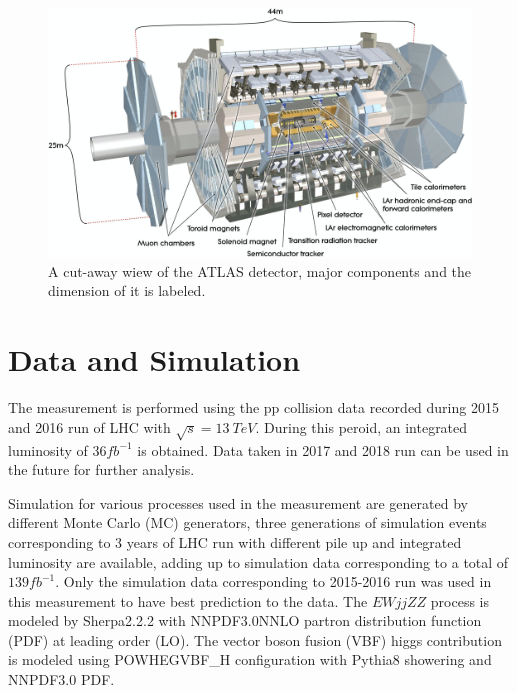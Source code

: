 \documentclass[12pt]{article}
\begin{document}
        \begin{figure}[ht]
            \begin{centering}
            \includegraphics[scale=0.35]{atlas_det.png}
            \caption{A cut-away wiew of the ATLAS detector, major components and the dimension of it is labeled.}
            \end{centering}
        \end{figure}
    \section{Data and Simulation}
        \par The measurement is performed using the pp collision data recorded during 2015 and 2016 run of LHC with $\sqrt{s} = 13\ TeV$.
        During this peroid, an integrated luminosity of $36fb^{-1}$ is obtained. Data taken in 2017 and 2018 run can be used in 
        the future for further analysis.
        \par Simulation for various processes used in the measurement are generated by different Monte Carlo (MC) generators, three generations 
        of simulation events corresponding to 3 years of LHC run with different pile up and integrated luminosity are available, adding up 
        to simulation data corresponding to a total of $139fb^{-1}$. Only the simulation data corresponding to 2015-2016 run was used in this measurement
        to have best prediction to the data.
        The $EW jjZZ$ process is modeled by Sherpa2.2.2\cite{0811.4622} with NNPDF3.0NNLO\cite{1405.0301} partron distribution function (PDF) at leading order (LO).
        The vector boson fusion (VBF) higgs contribution is modeled using POWHEGVBF\_H\cite{0911.5299} configuration with Pythia8\cite{1410.3012} showering and NNPDF3.0 PDF.
\end{document}
